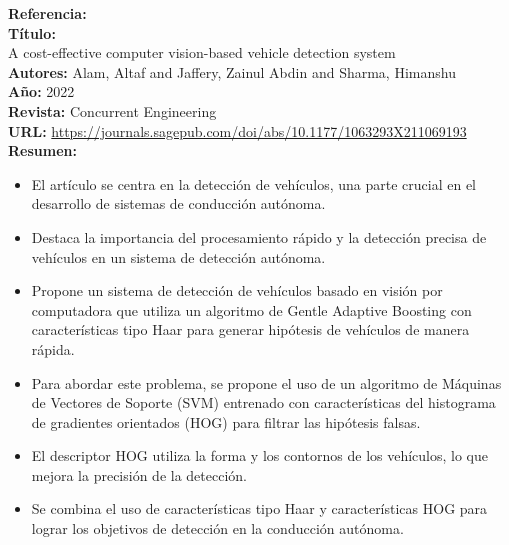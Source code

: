 \documentclass[10pt,letterpaper,final]{article}
\begin{document}
\begin{longtable}
        \hline
        \noindent \textbf{Referencia:}~\cite{alam2022cost}                                             \\
        \textbf{Título:}                                                                               \\
        A cost-effective computer vision-based vehicle detection system                                \\
        \textbf{Autores:}
        Alam, Altaf and Jaffery, Zainul Abdin and Sharma, Himanshu                                     \\
        \textbf{Año:}
        2022                                                                                           \\
        \textbf{Revista:}
        Concurrent Engineering                                                                         \\
        \textbf{URL:}
        \url{https://journals.sagepub.com/doi/abs/10.1177/1063293X211069193}                           \\
        \textbf{Resumen:}                                                                              \\
        \begin{itemize}
            \item El artículo se centra en la detección de vehículos, una parte crucial en el desarrollo de sistemas de conducción autónoma.
            \item Destaca la importancia del procesamiento rápido y la detección precisa de vehículos en un sistema de detección autónoma.
            \item Propone un sistema de detección de vehículos basado en visión por computadora que utiliza un algoritmo
            de Gentle Adaptive Boosting con características tipo Haar para generar hipótesis de vehículos de manera rápida.
            \item Para abordar este problema, se propone el uso de un algoritmo de Máquinas de Vectores de Soporte (SVM) entrenado con
            características del histograma de gradientes orientados (HOG) para filtrar las hipótesis falsas.
            \item El descriptor HOG utiliza la forma y los contornos de los vehículos, lo que mejora la precisión de la detección.
            \item Se combina el uso de características tipo Haar y características HOG para lograr los objetivos de detección en la conducción autónoma.

\end{itemize}
\end{longtable}
\end{document}
